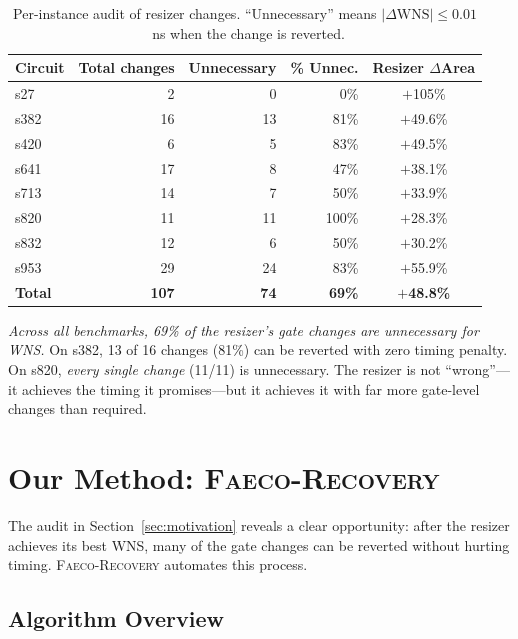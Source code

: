 \documentclass[journal]{IEEEtran}
\begin{document}
\begin{table}[t]
\centering
\caption{Per-instance audit of resizer changes. ``Unnecessary'' means
$|\Delta\text{WNS}| \leq 0.01$~ns when the change is reverted.}
\label{tab:audit}
\renewcommand{\arraystretch}{1.1}
\begin{tabular}{lrrrc}
\toprule
Circuit & Total changes & Unnecessary & \% Unnec. & Resizer $\Delta$Area \\
\midrule
s27  &  2 &  0 &   0\% & $+$105\% \\
s382 & 16 & 13 & 81\% & $+$49.6\% \\
s420 &  6 &  5 & 83\% & $+$49.5\% \\
s641 & 17 &  8 & 47\% & $+$38.1\% \\
s713 & 14 &  7 & 50\% & $+$33.9\% \\
s820 & 11 & 11 & 100\% & $+$28.3\% \\
s832 & 12 &  6 & 50\% & $+$30.2\% \\
s953 & 29 & 24 & 83\% & $+$55.9\% \\
\midrule
\textbf{Total} & \textbf{107} & \textbf{74} & \textbf{69\%} & \textbf{$+$48.8\%} \\
\bottomrule
\end{tabular}
\end{table}

\emph{Across all benchmarks, 69\% of the resizer's gate changes are
unnecessary for WNS.} On s382, 13 of 16 changes (81\%) can be reverted
with zero timing penalty. On s820, \emph{every single change} (11/11) is
unnecessary.  The resizer is not ``wrong''---it achieves the timing it
promises---but it achieves it with far more gate-level changes than
required.

\section{Our Method: \textsc{Faeco-Recovery}}

The audit in Section~\ref{sec:motivation} reveals a clear opportunity:
after the resizer achieves its best WNS, many of the gate changes can be
reverted without hurting timing. \textsc{Faeco-Recovery} automates this
process.

\subsection{Algorithm Overview}
\end{document}
